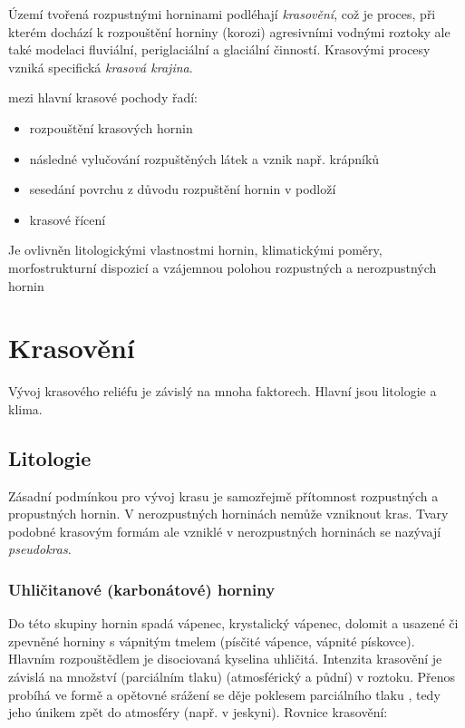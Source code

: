 Území tvořená rozpustnými horninami podléhají \emph{krasovění}, což je proces, při kterém dochází k rozpouštění horniny (korozi) agresivními vodnými roztoky ale také modelaci fluviální, periglaciální a glaciální činností. Krasovými procesy vzniká specifická \emph{krasová krajina}.

\textcite{demekObecnaGeomorfologie1987} mezi hlavní krasové pochody řadí:
\begin{itemize}
	\item rozpouštění krasových hornin
	\item následné vylučování rozpuštěných látek a vznik např. krápníků
	\item sesedání povrchu z důvodu rozpuštění hornin v podloží
	\item krasové řícení
\end{itemize}

Je ovlivněn litologickými vlastnostmi hornin, klimatickými poměry, morfostrukturní dispozicí a vzájemnou polohou rozpustných a nerozpustných hornin

\section{Krasovění}
Vývoj krasového reliéfu je závislý na mnoha faktorech. Hlavní jsou litologie a klima. 

\subsection{Litologie}
Zásadní podmínkou pro vývoj krasu je samozřejmě přítomnost rozpustných a propustných hornin. V nerozpustných horninách nemůže vzniknout kras. Tvary podobné krasovým formám ale vzniklé v nerozpustných horninách se nazývají \emph{pseudokras}.

\subsubsection{Uhličitanové (karbonátové) horniny} 
Do této skupiny hornin spadá vápenec, krystalický vápenec, dolomit a usazené či zpevněné horniny s vápnitým tmelem (písčité vápence, vápnité pískovce). Hlavním rozpouštědlem  je disociovaná kyselina uhličitá. Intenzita krasovění je závislá na množství (parciálním tlaku)  (atmosférický a půdní) v roztoku. Přenos probíhá ve formě  a opětovné srážení se děje poklesem parciálního tlaku , tedy jeho únikem zpět do atmosféry (např. v jeskyni). Rovnice krasovění:	

